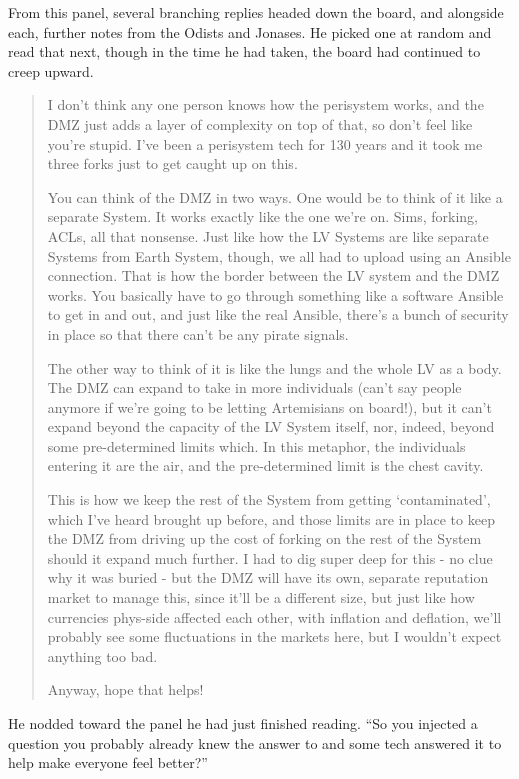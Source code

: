 From this panel, several branching replies headed down the board, and alongside each, further notes from the Odists and Jonases. He picked one at random and read that next, though in the time he had taken, the board had continued to creep upward.

\begin{quote}
I don't think any one person knows how the perisystem works, and the DMZ just adds a layer of complexity on top of that, so don't feel like you're stupid. I've been a perisystem tech for 130 years and it took me three forks just to get caught up on this.

You can think of the DMZ in two ways. One would be to think of it like a separate System. It works exactly like the one we're on. Sims, forking, ACLs, all that nonsense. Just like how the LV Systems are like separate Systems from Earth System, though, we all had to upload using an Ansible connection. That is how the border between the LV system and the DMZ works. You basically have to go through something like a software Ansible to get in and out, and just like the real Ansible, there's a bunch of security in place so that there can't be any pirate signals.

The other way to think of it is like the lungs and the whole LV as a body. The DMZ can expand to take in more individuals (can't say people anymore if we're going to be letting Artemisians on board!), but it can't expand beyond the capacity of the LV System itself, nor, indeed, beyond some pre-determined limits which. In this metaphor, the individuals entering it are the air, and the pre-determined limit is the chest cavity.

This is how we keep the rest of the System from getting `contaminated', which I've heard brought up before, and those limits are in place to keep the DMZ from driving up the cost of forking on the rest of the System should it expand much further. I had to dig super deep for this - no clue why it was buried - but the DMZ will have its own, separate reputation market to manage this, since it'll be a different size, but just like how currencies phys-side affected each other, with inflation and deflation, we'll probably see some fluctuations in the markets here, but I wouldn't expect anything too bad.

Anyway, hope that helps!
\end{quote}

He nodded toward the panel he had just finished reading. ``So you injected a question you probably already knew the answer to and some tech answered it to help make everyone feel better?''

